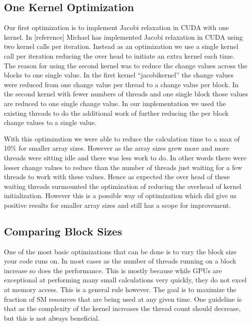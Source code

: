 \documentclass[10pt]{article}
\begin{document}
\begin{multicols}{2}
  \subsection{One Kernel Optimization}
  Our first optimization is to implement Jacobi relaxation in CUDA with one kernel.
  In [reference] Michael has implemented Jacobi relaxation in CUDA using two kernel calls per iteration.
  Instead as an optimization we use a single kernel call per iteration reducing the over head to initiate an extra kernel each time.
  The reason for using the second kernel was to reduce the change values across the blocks to one single value.
  In the first kernel ``jacobikernel'' the change values were reduced from one change value per thread to a change value per block.
  In the second kernel with fewer numbers of threads and one single block those values are reduced to one single change value.
  In our implementation we used the existing threads to do the additional work of further reducing the per block change values to a single value.

  With this optimization we were able to reduce the calculation time to a max of 10\% for smaller array sizes.
  However as the array sizes grew more and more threads were sitting idle and there was less work to do.
  In other words there were lesser change values to reduce than the number of threads just waiting for a few threads to work with these values.
  Hence as expected the over head of these waiting threads surmounted the optimization of reducing the overhead of kernel initialization.
  However this is a possible way of optimization which did give us positive results for smaller array sizes and still has a scope for improvement.
  
  \subsection{Comparing Block Sizes}
  One of the most basic optimizations that can be done is to vary the block size your code runs on.
  In most cases as the number of threads running on a block increase so does the performance.
  This is mostly because while GPUs are exceptional at performing many small calculations very quickly, they do not excel at memory access.
  This is a general rule however.
  The goal is to maximize the fraction of SM resources that are being used at any given time.
  One guideline is that as the complexity of the kernel increases the thread count should decrease, but this is not always beneficial.


\end{multicols}
\end{document}
